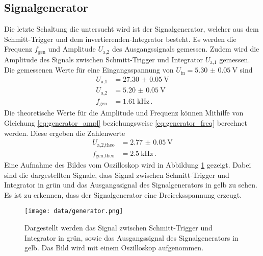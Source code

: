 \subsection{Signalgenerator}
Die letzte Schaltung die untersucht wird ist der Signalgenerator, welcher aus dem Schmitt-Trigger und dem invertierenden-Integrator besteht.
Es werden die Frequenz $f_\text{gen}$ und Amplitude $U_\text{a,2}$ des Ausgangssignals gemessen.
Zudem wird die Amplitude des Signals zwischen Schmitt-Trigger und Integrator $U_\text{a,1}$ gemessen.
Die gemessenen Werte für eine Eingangsspannung von $U_\text{in} = \SI{5.30(5)}{\V}$ sind 
\begin{align*}
    U_\text{a,1} &= \SI{27.30(5)}{\V} \\
    U_\text{a,2} &= \SI{5.20(5)}{\V} \\
    f_\text{gen} &= \SI{1.61}{\kilo\Hz} \, .
\end{align*}
Die theoretische Werte für die Amplitude und Frequenz können Mithilfe von Gleichung \eqref{eq:generator_ampl} beziehungsweise \eqref{eq:generator_freq} berechnet werden.
Diese ergeben die Zahlenwerte 
\begin{align*}
    U_\text{a,2,theo} &= \SI{2.77(5)}{\V} \\
    f_\text{gen,theo} &= \SI{2.5}{\kilo\Hz} \, .
\end{align*}
Eine Aufnahme des Bildes vom Oszilloskop wird in Abbildung \ref{fig:gen_oszi} gezeigt.
Dabei sind die dargestellten Signale, dass Signal zwischen Schmitt-Trigger und Integrator in grün und das Ausgangssignal des Signalgenerators in gelb zu sehen.
Es ist zu erkennen, dass der Signalgenerator eine Dreiecksspannung erzeugt.
\begin{figure}
    \centering
    \texttt{[image: data/generator.png]}
    \caption{Dargestellt werden das Signal zwischen Schmitt-Trigger und Integrator in grün, sowie das Ausgangssignal des Signalgenerators in gelb.
    Das Bild wird mit einem Oszilloskop aufgenommen.}
    \label{fig:gen_oszi}
\end{figure}



